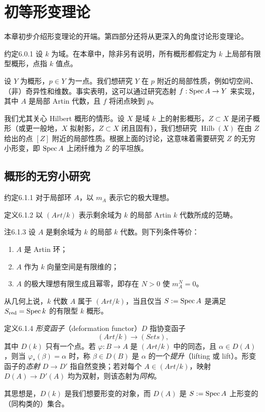 \chapter{初等形变理论}
本章初步介绍形变理论的开端。第四部分还将从更深入的角度讨论形变理论。

\begin{origstatement}{约定}{6.0.1}\label{ch06:6.0.1}
设 $k$ 为域。在本章中，除非另有说明，所有概形都假定为 $k$ 上局部有限型概形，点指 $k$ 值点。
\end{origstatement}
设 $Y$ 为概形，$p\in Y$ 为一点。我们想研究 $Y$ 在 $p$ 附近的局部性质，例如切空间、（非）奇异性和维数。事实表明，这可以通过研究态射 $f:\operatorname{Spec} A\to Y$ 来实现，其中 $A$ 是局部 Artin 代数，且 $f$ 将闭点映到 $p$。

我们尤其关心 Hilbert 概形的情形。设 $X$ 是域 $k$ 上的射影概形，$Z\subset X$ 是闭子概形（或更一般地，$X$ 拟射影，$Z\subset X$ 闭且固有），我们想研究 $\operatorname{Hilb}(X)$ 在由 $Z$ 给出的点 $[Z]$ 附近的局部性质。根据上面的讨论，这意味着需要研究 $Z$ 的无穷小形变，即 $\operatorname{Spec} A$ 上闭纤维为 $Z$ 的平坦族。

\section{概形的无穷小研究}
\begin{origstatement}{约定}{6.1.1}\label{ch06:6.1.1}
对于局部环 $A$，以 $m_A$ 表示它的极大理想。
\end{origstatement}
\begin{origstatement}{定义}{6.1.2}\label{ch06:6.1.2}
以 $(Art/k)$ 表示剩余域为 $k$ 的局部 Artin $k$ 代数所成的范畴。
\end{origstatement}
\begin{origstatement}{注}{6.1.3}\label{ch06:6.1.3}
设 $A$ 是剩余域为 $k$ 的局部 $k$ 代数。则下列条件等价：
\begin{enumerate}[label=(\arabic*)]
\item $A$ 是 Artin 环；
\item $A$ 作为 $k$ 向量空间是有限维的；
\item $A$ 的极大理想有限生成且幂零，即存在 $N>0$ 使 $m_A^N=0$。
\end{enumerate}
从几何上说，$k$ 代数 $A$ 属于 $(Art/k)$，当且仅当 $S:=\operatorname{Spec} A$ 是满足 $S_{\mathrm{red}}=\operatorname{Spec} k$ 的有限型 $k$ 概形。
\end{origstatement}
\begin{origstatement}{定义}{6.1.4}\label{ch06:6.1.4}
\emph{形变函子}（deformation functor）$D$ 指协变函子
\[
(Art/k)\longrightarrow (Sets),
\]
其中 $D(k)$ 只有一个点。若 $\varphi:B\to A$ 是 $(Art/k)$ 中的同态，且 $\alpha\in D(A)$，则当 $\varphi_*(\beta)=\alpha$ 时，称 $\beta\in D(B)$ 是 $\alpha$ 的一个\emph{提升}（lifting 或 lift）。形变函子的\emph{态射} $D\to D'$ 指自然变换；若对每个 $A\in(Art/k)$，映射 $D(A)\to D'(A)$ 均为双射，则该态射为\emph{同构}。
\end{origstatement}
其思想是，$D(k)$ 是我们想要形变的对象，而 $D(A)$ 是 $S:=\operatorname{Spec} A$ 上形变的（同构类的）集合。

